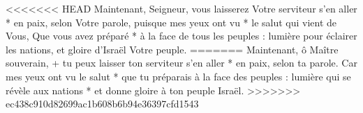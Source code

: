 <<<<<<< HEAD
Maintenant, Seigneur, vous laisserez Votre serviteur s'en aller * en paix, selon Votre parole,
\versseparator
puisque mes yeux ont vu * le salut qui vient de Vous,
\versseparator
Que vous avez préparé * à la face de tous les peuples :
\versseparator
lumière pour éclairer les nations, et gloire d'Israël Votre peuple.
=======
Maintenant, ô Maître souverain, +
tu peux laisser ton serviteur s'en aller *
en paix, selon ta parole.
\versseparator
Car mes yeux ont vu le salut *
que tu préparais à la face des peuples :
\versseparator
lumière qui se révèle aux nations *
et donne gloire à ton peuple Israël.
>>>>>>> ec438c910d82699ac1b608b6b94e36397cfd1543
